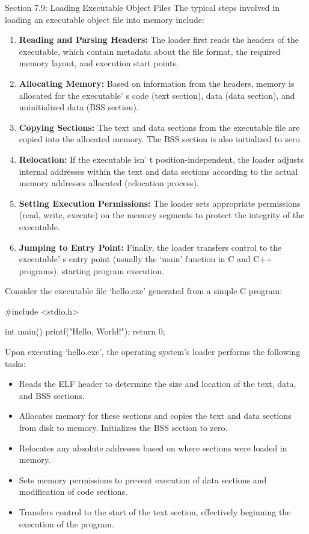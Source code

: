 \begin{notes}{Section 7.9: Loading Executable Object Files}
    The typical steps involved in loading an executable object file into memory include:
    \begin{enumerate}
        \item \textbf{Reading and Parsing Headers:} The loader first reads the headers of the executable, which contain metadata about the file format, the required memory layout, and execution start points.
        \item \textbf{Allocating Memory:} Based on information from the headers, memory is allocated for the executable' s code (text section), data (data section), and uninitialized data (BSS section).
        \item \textbf{Copying Sections:} The text and data sections from the executable file are copied into the allocated memory. The BSS section is also initialized to zero.
        \item \textbf{Relocation:} If the executable isn' t position-independent, the loader adjusts internal addresses within the text and data sections according to the actual memory addresses 
        allocated (relocation process).
        \item \textbf{Setting Execution Permissions:} The loader sets appropriate permissions (read, write, execute) on the memory segments to protect the integrity of the executable.
        \item \textbf{Jumping to Entry Point:} Finally, the loader transfers control to the executable' s entry point (usually the `main' function in C and C++ programs), starting program execution.
    \end{enumerate}
    
    \begin{highlight}
        Consider the executable file `hello.exe' generated from a simple C program:
    \begin{code}[C]
    #include <stdio.h>

    int main() {
        printf("Hello, World!\n");
        return 0;
    }
        \end{code}
        Upon executing `hello.exe', the operating system's loader performs the following tasks:
        \begin{itemize}
            \item Reads the ELF header to determine the size and location of the text, data, and BSS sections.
            \item Allocates memory for these sections and copies the text and data sections from disk to memory. Initializes the BSS section to zero.
            \item Relocates any absolute addresses based on where sections were loaded in memory.
            \item Sets memory permissions to prevent execution of data sections and modification of code sections.
            \item Transfers control to the start of the text section, effectively beginning the execution of the program.
        \end{itemize}
    \end{highlight}
    

\end{notes}
